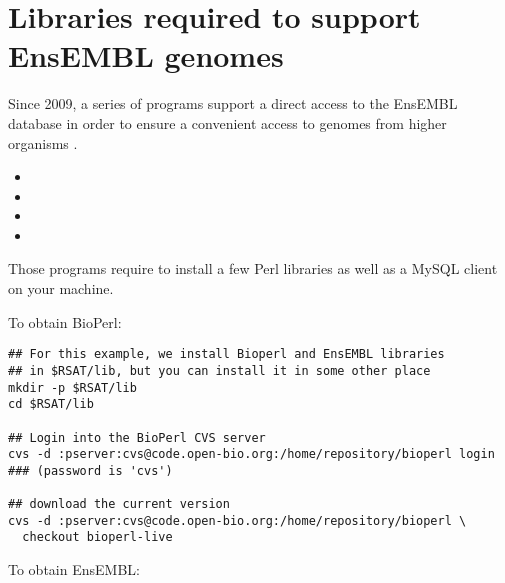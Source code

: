 \documentclass{book}
\begin{document}


\section{Libraries required to support EnsEMBL genomes}

Since 2009, a series of \RSAT programs support a direct access to the
EnsEMBL database in order to ensure a convenient access to genomes
from higher organisms \cite{Sand:2009}.

\begin{itemize}
\item {}
\item {}
\item {} 
\item {}
\end{itemize}

Those programs require to install a few Perl libraries as well as a
MySQL client on your machine. 

To obtain BioPerl:

\begin{footnotesize}
\begin{verbatim}
## For this example, we install Bioperl and EnsEMBL libraries 
## in $RSAT/lib, but you can install it in some other place
mkdir -p $RSAT/lib
cd $RSAT/lib

## Login into the BioPerl CVS server
cvs -d :pserver:cvs@code.open-bio.org:/home/repository/bioperl login
### (password is 'cvs')

## download the current version
cvs -d :pserver:cvs@code.open-bio.org:/home/repository/bioperl \
  checkout bioperl-live

\end{verbatim}
\end{footnotesize}


To obtain EnsEMBL:
\end{document}
